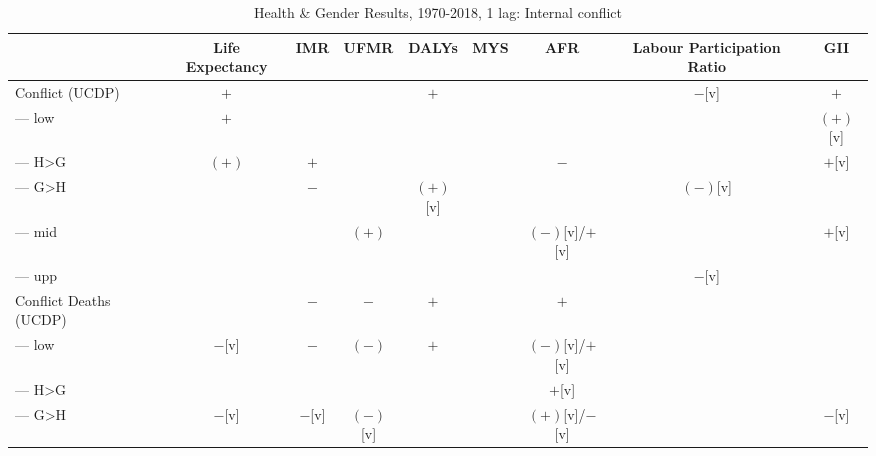 \documentclass[12pt]{article}
\begin{document}
\begin{table}
\small
\centering
\caption{Health \& Gender Results, 1970-2018, 1 lag: Internal conflict}
\label{table_summary}
\begin{tabular}{lcccccccc}
\toprule
                          & Life Expectancy     & IMR                 & UFMR         & DALYs           & MYS      & AFR                           & Labour Participation Ratio     & GII \\
\midrule
Conflict (UCDP)           & $+$                 &                     &              & $+$             &          &                               & $-$[v]                         & $+$ \\
--- low                   & $+$                 &                     &              &                 &          &                               &                                & $(+)$[v] \\
--- H>G                   & $(+)$               & $+$                 &              &                 &          & $-$                           &                                & $+$[v] \\
--- G>H                   &                     & $-$                 &              & $(+)$[v]        &          &                               & $(-)$[v]                       & \\
--- mid                   &                     &                     & $(+)$        &                 &          & $(-)$[v]/$+$[v]               &                                & $+$[v] \\
--- upp                   &                     &                     &              &                 &          &                               & $-$[v]                         & \\
Conflict Deaths (UCDP)    &                     & $-$                 & $-$          & $+$             &          & $+$                           &                                & \\
--- low                   & $-$[v]              & $-$                 & $(-)$        & $+$             &          & $(-)$[v]/$+$[v]               &                                & \\
--- H>G                   &                     &                     &              &                 &          & $+$[v]                        &                                & \\
--- G>H                   & $-$[v]              & $-$[v]              & $(-)$[v]     &                 &          & $(+)$[v]/$-$[v]               &                                & $-$[v] \\

\end{tabular}
\end{table}
\end{document}
